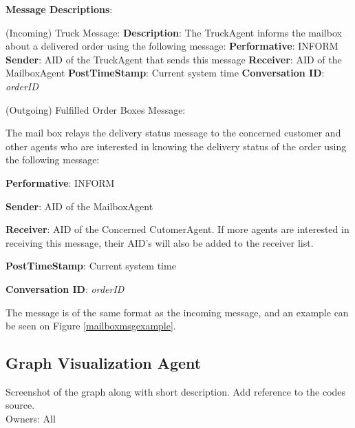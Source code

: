 \documentclass[11pt, a4paper]{article}
\begin{document}
\hfill\break
\textbf{Message Descriptions}:

\hfill\break
(Incoming) Truck Message:
\hfill\break
\textbf{Description}:
The TruckAgent informs the mailbox about a delivered order using the following message:
\hfill\break
\textbf{Performative}: INFORM
\hfill\break
\textbf{Sender}: AID of the TruckAgent that sends this message
\hfill\break
\textbf{Receiver}: AID of the MailboxAgent
\hfill\break
\textbf{PostTimeStamp}: Current system time
\hfill\break
\textbf{Conversation ID}: \textit{orderID}

\hfill\break
	
(Outgoing) Fulfilled Order Boxes Message:
	
The mail box relays the delivery status message to the concerned customer and other agents who are interested in knowing the delivery status of the order using the following message:
	
\textbf{Performative}: INFORM
	
\textbf{Sender}: AID of the MailboxAgent
	
\textbf{Receiver}: AID of the Concerned CutomerAgent. If more agents are interested in receiving this message, their AID's will also be added to the receiver list.
	
\textbf{PostTimeStamp}: Current system time
	
\textbf{Conversation ID}: \textit{orderID}
	
The message is of the same format as the incoming message, and an example can be seen on Figure \ref{mailboxmsgexample}.


\newpage
\subsection{Graph Visualization Agent}\label{GraphVisualizationAgent}
Screenshot of the graph along with short description. Add reference to the codes source. 
\\Owners: All
\end{document}
